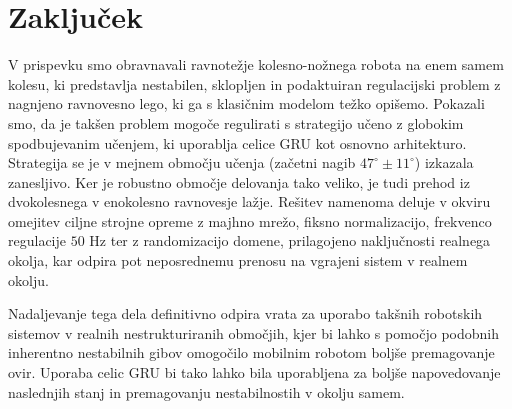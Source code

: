 \section{Zaključek}
V prispevku smo obravnavali ravnotežje kolesno-nožnega robota na enem samem kolesu, ki predstavlja nestabilen, sklopljen in podaktuiran regulacijski problem z nagnjeno ravnovesno lego, ki ga s klasičnim modelom težko opišemo. Pokazali smo, da je takšen problem mogoče regulirati s strategijo učeno z globokim spodbujevanim učenjem, ki uporablja celice GRU kot osnovno arhitekturo. Strategija se je v mejnem območju učenja (začetni nagib $47^\circ \pm 11^\circ$) izkazala zanesljivo. Ker je robustno območje delovanja tako veliko, je tudi prehod iz dvokolesnega v enokolesno ravnovesje lažje. Rešitev namenoma deluje v okviru omejitev ciljne strojne opreme z majhno mrežo, fiksno normalizacijo, frekvenco regulacije $50$ Hz ter z randomizacijo domene, prilagojeno naključnosti realnega okolja, kar odpira pot neposrednemu prenosu na vgrajeni sistem v realnem okolju. 

Nadaljevanje tega dela definitivno odpira vrata za uporabo takšnih robotskih sistemov v realnih nestrukturiranih območjih, kjer bi lahko s pomočjo podobnih inherentno nestabilnih gibov omogočilo mobilnim robotom boljše premagovanje ovir. Uporaba celic GRU bi tako lahko bila uporabljena za boljše napovedovanje naslednjih stanj in premagovanju nestabilnostih v okolju samem.